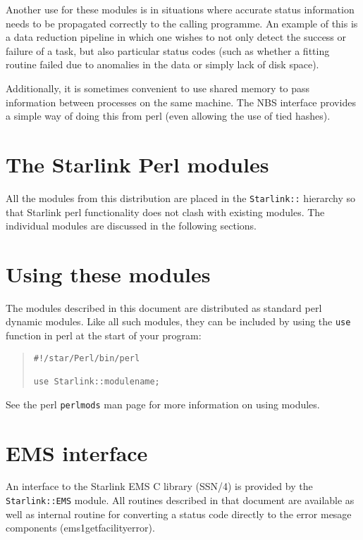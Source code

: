 \documentclass[twoside,11pt]{article}
\newenvironment{myquote}{\begin{quote}\begin{small}}{\end{small}\end{quote}}
\newcommand{\xref}[3]{#1}
\renewcommand{\_}{\texttt{\symbol{95}}}
\begin{document}
Another use for these modules is in situations where accurate status
information needs to be propagated correctly to the calling
programme. An example of this is a data reduction pipeline in which
one wishes to not only detect the success or failure of a task, but
also particular status codes (such as whether a fitting routine failed
due to anomalies in the data or simply lack of disk space).

Additionally, it is sometimes convenient to use shared memory to pass
information between processes on the same machine. The NBS interface
provides a simple way of doing this from perl (even allowing the use
of tied hashes).

\section{The Starlink Perl modules}

All the modules from this distribution are placed in the \texttt{Starlink::}
hierarchy so that Starlink perl functionality does not clash with existing
modules.  The individual modules are discussed in the following sections.

\section{Using these modules}

The modules described in this document are distributed as standard
perl dynamic modules. Like all such modules, they can be included by
using the \texttt{use} function in perl at the start of your program:

\begin{myquote}
\begin{verbatim}
#!/star/Perl/bin/perl

use Starlink::modulename;
\end{verbatim}
\end{myquote}

See the perl \texttt{perlmods} man page for more information on using modules.


\section{EMS interface}

An interface to the Starlink EMS C library (\xref{SSN/4}{ssn4}{}) is
provided by the \texttt{Starlink::EMS} module. All routines described in
that document are available as well as internal routine for converting a
status code directly to the error mesage components (ems1\_get\_facility\_error).
\end{document}
